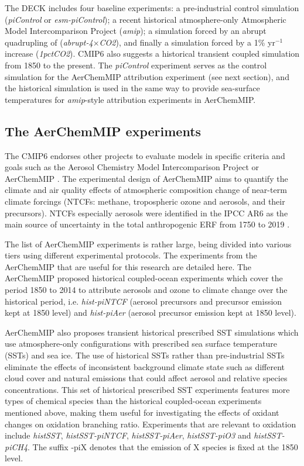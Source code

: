 The DECK includes four baseline experiments: a pre-industrial control simulation (\textit{piControl} or \textit{esm-piControl}); a recent historical atmosphere-only Atmospheric Model Intercomparison Project (\textit{amip}); a simulation forced by an abrupt quadrupling of  (\textit{abrupt-4$\times$CO2}), and finally a simulation forced by a 1\% yr$^{-1}$  increase (\textit{1pctCO2}). CMIP6 also suggests a historical transient coupled simulation from 1850 to the present.  The \textit{piControl} experiment serves as the control simulation for the AerChemMIP attribution experiment (see next section), and the historical simulation is used in the same way to provide sea-surface temperatures for \textit{amip}-style attribution experiments in AerChemMIP.

\subsection{The AerChemMIP experiments}

The CMIP6 endorses other projects to evaluate models in specific criteria and goals such as the Aerosol Chemistry Model Intercomparison Project or AerChemMIP \citep{collinsAerChemMIPQuantifyingEffects2017}. The experimental design of AerChemMIP aims to quantify the climate and air quality effects of atmospheric composition change of near-term climate forcings (NTCFs: methane, tropospheric ozone and aerosols, and their precursors). NTCFs especially aerosols were identified in the IPCC AR6 as the main source of uncertainty in the total anthropogenic ERF from 1750 to 2019 \citep[see figure \ref{fig:1.ERF} and][]{forsterEarthEnergyBudget2021}.

The list of AerChemMIP experiments is rather large, being divided into various tiers using different experimental protocols. The experiments from the AerChemMIP that are useful for this research are detailed here. The AerChemMIP proposed historical coupled-ocean experiments which cover the period 1850 to 2014 to attribute aerosols and ozone to climate change over the historical period, i.e. \textit{hist-piNTCF} (aerosol precursors and  precursor emission kept at 1850 level) and \textit{hist-piAer} (aerosol precursor emission kept at 1850 level). 

AerChemMIP also proposes transient historical prescribed SST simulations which use atmosphere-only configurations with prescribed sea surface temperature (SSTs) and sea ice. The use of historical SSTs rather than pre-industrial SSTs eliminate the effects of inconsistent background climate state such as different cloud cover and natural emissions that could affect aerosol and relative species concentrations. This set of historical prescribed SST experiments features more types of chemical species than the historical coupled-ocean experiments mentioned above, making them useful for investigating the effects of oxidant changes on oxidation branching ratio. Experiments that are relevant to  oxidation include \textit{histSST}, \textit{histSST-piNTCF}, \textit{histSST-piAer}, \textit{histSST-piO3} and \textit{histSST-piCH4}. The suffix -piX denotes that the emission of X species is fixed at the 1850 level.


